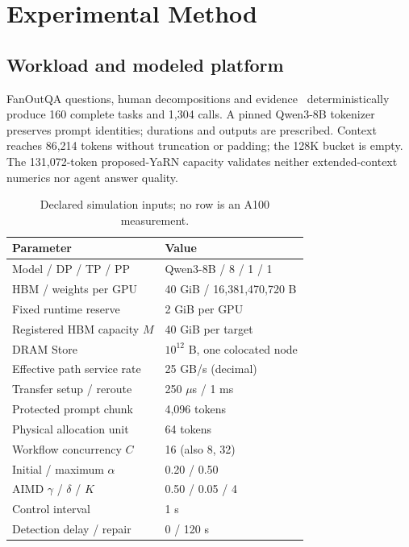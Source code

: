 \section{Experimental Method}
\label{sec:experimental-method}
\subsection{Workload and modeled platform}
FanOutQA questions, human decompositions and evidence~\cite{zhu2024fanoutqa}
deterministically produce 160 complete tasks and 1,304 calls. A pinned
Qwen3-8B tokenizer~\cite{qwen2025technical} preserves prompt identities;
durations and outputs are prescribed. Context reaches 86,214 tokens without
truncation or padding; the 128K bucket is empty. The 131,072-token proposed-YaRN
capacity validates neither extended-context numerics nor agent answer quality.

\begin{table}[t]
\centering
\caption{Declared simulation inputs; no row is an A100 measurement.}
\label{tab:configuration}
\setlength{\tabcolsep}{3pt}
\begin{tabular}{@{}ll@{}}
\toprule
Parameter & Value \\
\midrule
Model / DP / TP / PP & Qwen3-8B / 8 / 1 / 1 \\
HBM / weights per GPU & 40 GiB / 16,381,470,720 B \\
Fixed runtime reserve & 2 GiB per GPU \\
Registered HBM capacity $M$ & 40 GiB per target \\
DRAM Store & $10^{12}$ B, one colocated node \\
Effective path service rate & 25 GB/s (decimal) \\
Transfer setup / reroute & 250 $\mu$s / 1 ms \\
Protected prompt chunk & 4,096 tokens \\
Physical allocation unit & 64 tokens \\
Workflow concurrency $C$ & 16 (also 8, 32) \\
Initial / maximum $\alpha$ & 0.20 / 0.50 \\
AIMD $\gamma$ / $\delta$ / $K$ & 0.50 / 0.05 / 4 \\
Control interval & 1 s \\
Detection delay / repair & 0 / 120 s \\
\bottomrule
\end{tabular}
\end{table}

